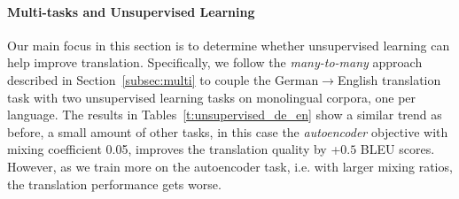 \paragraph{Multi-tasks and Unsupervised Learning}
Our main focus in this section is to determine whether unsupervised
learning can help improve translation. Specifically, we follow the {\it
many-to-many} approach described in Section~\ref{subsec:multi} to couple
the German$\rightarrow$English translation task with two unsupervised learning
tasks on monolingual corpora, one per language.
The results in Tables~\ref{t:unsupervised_de_en} show a similar trend as before,
a small amount of other tasks, in this case the {\it autoencoder} objective with
mixing coefficient 0.05, improves the translation quality by +$0.5$ BLEU
scores. However, as we train more on the 
autoencoder task, i.e. with larger mixing ratios, the translation performance gets worse. 

